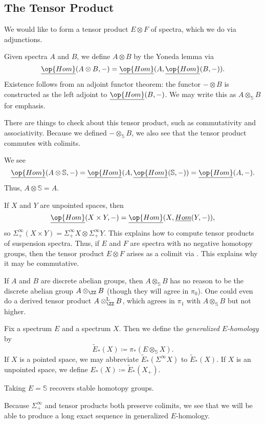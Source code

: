 \documentclass[../notes.tex]{subfiles}
\begin{document}
\subsection{The Tensor Product}
We would like to form a tensor product $E\otimes F$ of spectra, which we do via adjunctions.
\begin{definition}
	Given spectra $A$ and $B$, we define $A\otimes B$ by the Yoneda lemma via
	\[\underline{\op{Hom}}(A\otimes B,-)=\underline{\op{Hom}}(A,\underline{\op{Hom}}(B,-)).\]
	Existence follows from an adjoint functor theorem: the functor $-\otimes B$ is constructed as the left adjoint to $\underline{\op{Hom}}(B,-)$. We may write this as $A\otimes_{\mathbb S}B$ for emphasis.
\end{definition}
\begin{remark}
	There are things to check about this tensor product, such as commutativity and associativity. Because we defined $-\otimes_{\mathbb S}B$, we also see that the tensor product commutes with colimits.
\end{remark}
\begin{example}
	We see
	\[\underline{\op{Hom}}(A\otimes\mathbb S,-)=\underline{\op{Hom}}(A,\underline{\op{Hom}}(\mathbb S,-))=\underline{\op{Hom}}(A,-).\]
	Thus, $A\otimes\mathbb S=A$.
\end{example}
\begin{remark}
	If $X$ and $Y$ are unpointed spaces, then
	\[\underline{\op{Hom}}(X\times Y,-)=\underline{\op{Hom}}(X,\underline{Hom}(Y,-)),\]
	so $\Sigma^\infty_+(X\times Y)=\Sigma_+^\infty X\otimes\Sigma^\infty_+Y$. This explains how to compute tensor products of suspension spectra. Thus, if $E$ and $F$ are spectra with no negative homotopy groups, then the tensor product $E\otimes F$ arises as a colimit via . This explains why it may be commutative.
\end{remark}
\begin{example}
	If $A$ and $B$ are discrete abelian groups, then $A\otimes_{\mathbb S}B$ has no reason to be the discrete abelian group $A\otimes_\ZZ B$ (though they will agree in $\pi_0$). One could even do a derived tensor product $A\otimes_\ZZ^{\mathrm{L}}B$, which agrees in $\pi_1$ with $A\otimes_{\mathbb S}B$ but not higher.
\end{example}
\begin{definition}
	Fix a spectrum $E$ and a spectrum $X$. Then we define the \textit{generalized $E$-homology} by
	\[\widetilde E_*(X)\coloneqq\pi_*(E\otimes_{\mathbb S}X).\]
	If $X$ is a pointed space, we may abbreviate $\widetilde E_*(\Sigma^\infty X)$ to $\widetilde E_*(X)$. If $X$ is an unpointed space, we define $E_*(X)\coloneqq\widetilde E_*(X_+)$.
\end{definition}
\begin{example}
	Taking $E=\mathbb S$ recovers stable homotopy groups.
\end{example}
\begin{example}
	Because $\Sigma^\infty_+$ and tensor products both preserve colimits, we see that we will be able to produce a long exact sequence in generalized $E$-homology.
\end{example}
\end{document}
